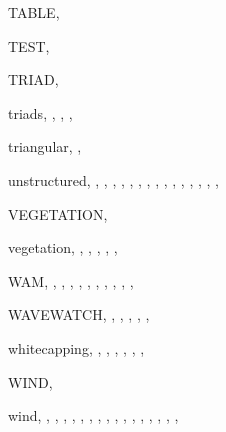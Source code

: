 \documentclass[12pt]{book}
\begin{document}
\begin{theindex}
  \indexspace

  \item TABLE, 
  \item TEST, 
  \item TRIAD, 
  \item triads, , , ,
  \item triangular, , 

  \indexspace

  \item unstructured, , ,
		, , ,
		, , ,
		, , ,
		, , ,
		, 

  \indexspace

  \item VEGETATION, 
  \item vegetation, , , ,
		, , 

  \indexspace

  \item WAM, , , ,
		, , ,
		, , ,
		, 
  \item WAVEWATCH, , , ,
		, , 
  \item whitecapping, , , ,
		, , ,
  \item WIND, 
  \item wind, , , ,
		, , ,
		, , ,
		, , ,
		, ,
		, , 

\end{theindex}
\end{document}
